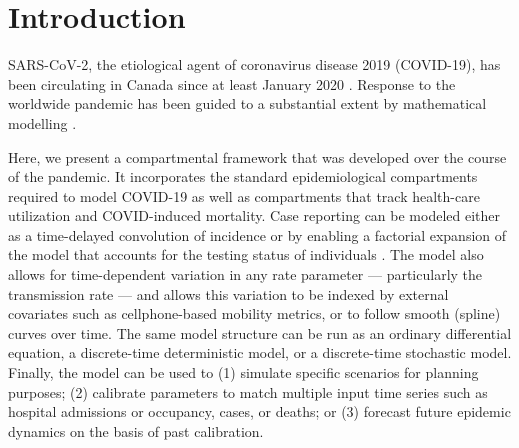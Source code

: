 \documentclass[12pt]{article}\usepackage[]{graphicx}\usepackage[]{color}
\begin{document}

\tableofcontents





\section{Introduction}

SARS-CoV-2, the etiological agent of coronavirus disease 2019 (COVID-19), has been circulating in Canada since at least January 2020 \cite{onpr_200125}.
Response to the worldwide pandemic \cite{Li+20,Fauc+20} has been guided to a substantial extent by mathematical modelling \cite{Flax+20}.


Here, we present a compartmental framework that was developed over the course of the pandemic. 
It incorporates the standard epidemiological compartments required to model COVID-19 as well as compartments that track health-care utilization and COVID-induced
mortality. 
Case reporting can be modeled either as a time-delayed convolution of incidence or by enabling a factorial expansion of the model that accounts for the testing status of individuals \cite{Fris+20}. 
The model also allows for time-dependent variation in any rate parameter --- particularly the transmission rate --- and allows this variation to be indexed by external covariates such as cellphone-based mobility metrics, or to follow smooth (spline) curves over time. 
The same model structure can be run as an ordinary differential equation, a discrete-time deterministic model, or a discrete-time stochastic model.
Finally, the model can be used to
(1) simulate specific scenarios for planning purposes;
(2) calibrate parameters to match multiple input time series such as hospital admissions or occupancy, cases, or deaths; or
(3) forecast future epidemic dynamics on the basis of past calibration.
\end{document}
